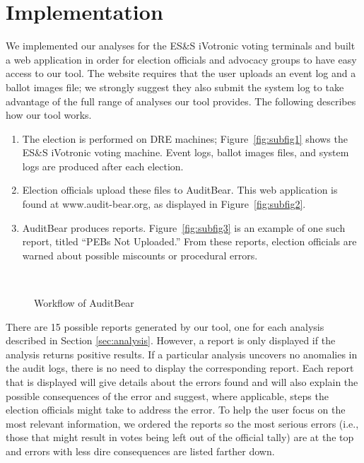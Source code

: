 \section{Implementation}
We implemented our analyses for the ES\&S iVotronic voting terminals
and built a web application in order for election officials and
advocacy groups to have easy access to our tool. The website requires
that the user uploads an event log and a ballot images file; we strongly
suggest they also submit the system log to take advantage of the
full range of analyses our tool provides.  The following describes how
our tool works.   

\begin{enumerate}
\item
The election is performed on DRE machines; Figure~\ref{fig:subfig1} shows the ES\&S iVotronic voting machine.  Event logs, ballot images files, and system logs are produced after each election.
\item
Election officials upload these files to AuditBear.  This web application is found at www.audit-bear.org, as displayed in Figure~\ref{fig:subfig2}.  
\item
AuditBear produces reports.  Figure~\ref{fig:subfig3} is an example of
one such report, titled ``PEBs Not Uploaded.'' From these reports,
election officials are 
warned about possible miscounts or procedural errors.  
\end{enumerate}

\begin{figure}[h]
\centering
\mbox{
}
\caption{Workflow of AuditBear}
\label{auditBear}
\end{figure}


There are 15 possible reports generated by our tool, one
for each analysis described in Section \ref{sec:analysis}.  However, a report is only
displayed if the analysis returns positive results. If a particular
analysis uncovers no anomalies in the audit logs, there is no need to display the
corresponding report. Each report that is displayed will give details
about the errors found and will
also explain the possible consequences of the error and suggest, where
applicable, steps the election officials might take to address
the error. To help the user focus on the most relevant information, we
ordered the reports so the most serious errors (i.e., those that might
result in votes being left out of the official tally) are at the top
and errors with less dire consequences are listed farther down. 
